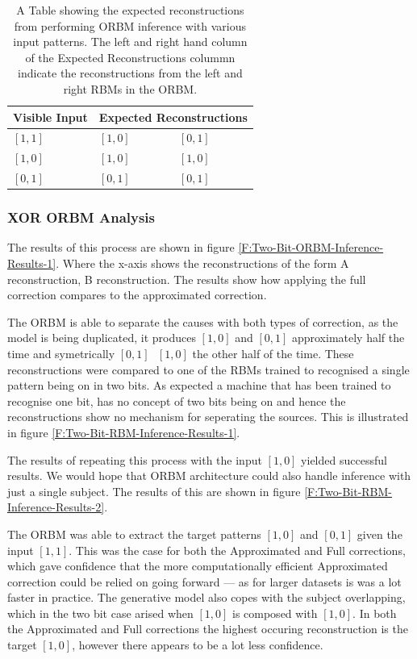 \begin{table}[]
\centering
\begin{tabular}{|l|l|l|}
\hline
Visible Input & \multicolumn{2}{l|}{Expected Reconstructions} \\ \hline
$[1 , 1 ]$    & $[1, 0]$              & $[0,1]$               \\ \hline
$[1, 0 ]$     & $[1,0]$               & $[1, 0]$              \\ \hline
$[0, 1]$      & $[0,1]$               & $[0,1]$               \\ \hline
\end{tabular}
\caption{A Table showing the expected reconstructions from performing ORBM inference with various input patterns. The left and right hand column of the Expected Reconstructions colummn indicate the reconstructions from the left and right RBMs in the ORBM.}
\label{my-label}
\end{table}

\subsubsection{XOR ORBM Analysis}

The results of this process are shown in figure \ref{F:Two-Bit-ORBM-Inference-Results-1}. Where the x-axis shows the reconstructions of the form A reconstruction, B reconstruction. The results show how applying the full correction compares to the approximated correction.

The ORBM is able to separate the causes with both types of correction, as the model is being duplicated, it produces $[1,0]$ and $[0,1]$ approximately half the time and symetrically $[0,1]\text{ }[1,0]$ the other half of the time. These reconstructions were compared to one of the RBMs trained to recognised a single pattern being on in two bits. As expected a machine that has been trained to recognise one bit, has no concept of two bits being on and hence the reconstructions show no mechanism for seperating the sources. This is illustrated in figure \ref{F:Two-Bit-RBM-Inference-Results-1}.

The results of repeating this process with the input $[1,0]$ yielded successful results. We would hope that ORBM architecture could also handle inference with just a single subject. The results of this are shown in
figure \ref{F:Two-Bit-RBM-Inference-Results-2}.

The ORBM was able to extract the target patterns $[1,0]$ and $[0,1]$ given the input $[1,1]$. This was the case for both the Approximated and Full corrections, which gave confidence that the more computationally efficient Approximated correction could be relied on going forward --- as for larger datasets is was a lot faster in practice. The generative model also copes with the subject overlapping, which in the two bit case arised when $[1,0]$ is composed with $[1,0]$. In both the Approximated and Full corrections the highest occuring reconstruction is the target $[1,0]$, however there appears to be a lot less confidence.



